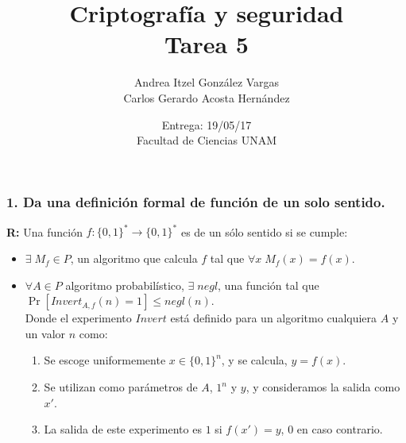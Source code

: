 \documentclass[14pt]{article}
\title{Criptografía y seguridad \\ Tarea 5}
\author{Andrea Itzel González Vargas \\ Carlos Gerardo Acosta Hernández}
\date{Entrega: 19/05/17 \\ Facultad de Ciencias UNAM}
\begin{document}
\maketitle

\subsubsection*{1. Da una definición formal de función de un solo sentido.}
\textbf{R:} Una función $f : \{0,1\}^* \to \{0,1\}^*$ es de un sólo sentido si se cumple:
\begin{itemize}
\item $\exists\; M_f \in P$, un algoritmo que calcula $f$ tal que $\forall x \;M_f(x) = f(x)$. 
\item $\forall A \in P$ algoritmo probabilístico, $\exists \;negl$, una función tal que $\Pr[Invert_{A,f}(n) = 1] \leq negl(n)$.\\
  Donde el experimento $Invert$ está definido para un algoritmo cualquiera $A$ y un valor $n$ como:
  \begin{enumerate}
  \item Se escoge uniformemente $x \in \{0,1\}^n$, y se calcula, $y = f(x)$.
  \item Se utilizan como parámetros de $A$, $1^n$ y $y$, y consideramos la salida como $x'$.
  \item La salida de este experimento es $1$ si $f(x') = y$, $0$ en caso contrario.
  \end{enumerate}
\end{itemize}
\end{document}
